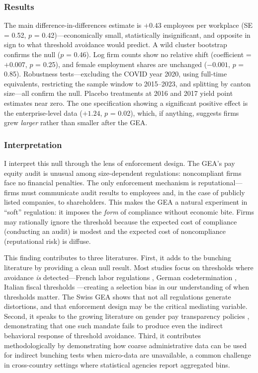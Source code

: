\documentclass[12pt]{article}
\begin{document}
\subsubsection*{Results} The main difference-in-differences estimate is $+0.43$ employees per workplace (SE = 0.52, $p$ = 0.42)---economically small, statistically insignificant, and opposite in sign to what threshold avoidance would predict. A wild cluster bootstrap confirms the null ($p$ = 0.46). Log firm counts show no relative shift (coefficient = $+0.007$, $p$ = 0.25), and female employment shares are unchanged ($-0.001$, $p$ = 0.85). Robustness tests---excluding the COVID year 2020, using full-time equivalents, restricting the sample window to 2015--2023, and splitting by canton size---all confirm the null. Placebo treatments at 2016 and 2017 yield point estimates near zero. The one specification showing a significant positive effect is the enterprise-level data ($+1.24$, $p$ = 0.02), which, if anything, suggests firms grew \emph{larger} rather than smaller after the GEA.

\subsubsection*{Interpretation} I interpret this null through the lens of enforcement design. The GEA's pay equity audit is unusual among size-dependent regulations: noncompliant firms face no financial penalties. The only enforcement mechanism is reputational---firms must communicate audit results to employees and, in the case of publicly listed companies, to shareholders. This makes the GEA a natural experiment in ``soft'' regulation: it imposes the \emph{form} of compliance without economic bite. Firms may rationally ignore the threshold because the expected cost of compliance (conducting an audit) is modest and the expected cost of noncompliance (reputational risk) is diffuse.

This finding contributes to three literatures. First, it adds to the bunching literature by providing a clean null result. Most studies focus on thresholds where avoidance \emph{is} detected---French labor regulations \citep{garicano2016firm}, German codetermination \citep{mueller2020codetermination}, Italian fiscal thresholds \citep{ferracci2014evidence}---creating a selection bias in our understanding of when thresholds matter. The Swiss GEA shows that not all regulations generate distortions, and that enforcement design may be the critical mediating variable. Second, it speaks to the growing literature on gender pay transparency policies \citep{baker2023pay, bennedsen2022firms, duchini2020pay}, demonstrating that one such mandate fails to produce even the indirect behavioral response of threshold avoidance. Third, it contributes methodologically by demonstrating how coarse administrative data can be used for indirect bunching tests when micro-data are unavailable, a common challenge in cross-country settings where statistical agencies report aggregated bins.
\end{document}
